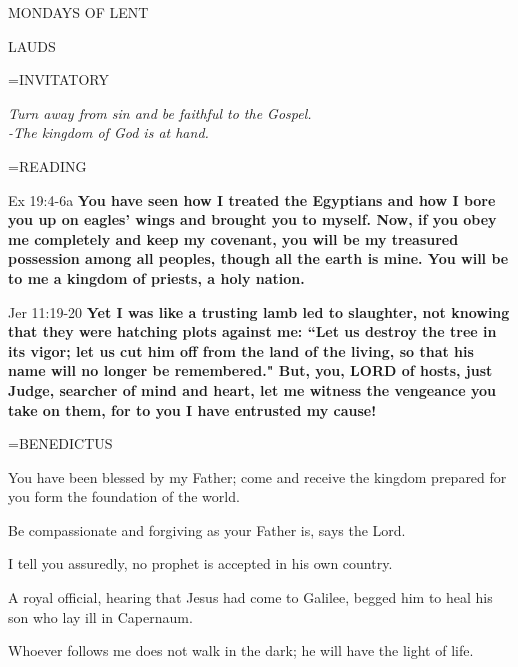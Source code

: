 \begin{center}
\normalsize \begin{center}\normalsize MONDAYS OF LENT\\
\end{center}
\end{center}

\begin{flushleft}\normalsize LAUDS\\\end{flushleft}

\hangindent=\parindent \small{INVITATORY}
\begin{center}
\textit{Turn away from sin and be faithful to the Gospel.\\}
\textit{-The kingdom of God is at hand.\\}
\end{center}

\hangindent=\parindent \small READING
\begin{description}[labelindent=\parindent, leftmargin=*]
\item [Week 1-4:]   Ex 19:4-6a \textbf{  You have seen how I treated the Egyptians and how I bore you up on eagles’ wings and brought you to myself. Now, if you obey me completely and keep my covenant, you will be my treasured possession among all peoples, though all the earth is mine. You will be to me a kingdom of priests, a holy nation.}
\item [Week 5:]   Jer 11:19-20 \textbf{  Yet I was like a trusting lamb led to slaughter, not knowing that they were hatching plots against me: “Let us destroy the tree in its vigor; let us cut him off from the land of the living, so that his name will no longer be remembered." But, you, LORD of hosts, just Judge, searcher of mind and heart, let me witness the vengeance you take on them, for to you I have entrusted my cause!}
\end{description}

\hangindent=\parindent \small BENEDICTUS
\begin{description}[labelindent=\parindent, noitemsep, leftmargin=*]
\item [Week 1:] 	You have been blessed by my Father; come and receive the kingdom prepared for you form the foundation of the world.
\item [Week 2:] 	Be compassionate and forgiving as your Father is, says the Lord.
\item [Week 3:] 	I tell you assuredly, no prophet is accepted in his own country.
\item [Week 4:] 	A royal official, hearing that Jesus had come to Galilee, begged him to heal his son who lay ill in Capernaum.
\item [Week 5:] 	Whoever follows me does not walk in the dark; he will have the light of life.
\end{description}

